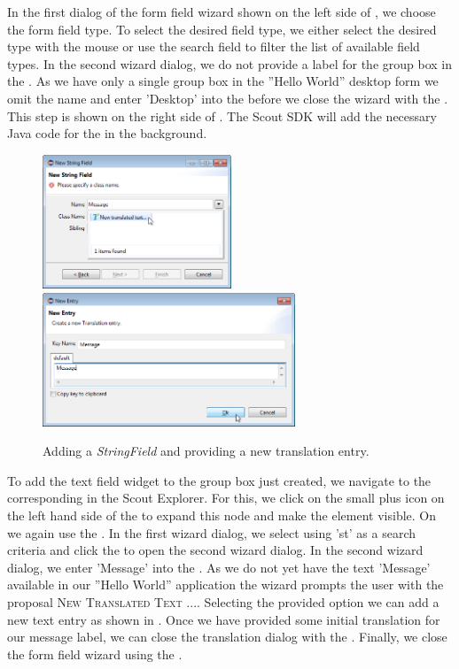 \documentclass[a4paper,10pt,twoside]{book}
\begin{document}
In the first dialog of the form field wizard shown on the left side of , we choose the form field type.
To select the desired field type, we either select the desired type with the mouse or use the search field to filter the list of available field types.
In the second wizard dialog, we do not provide a label for the group box in the .
As we have only a single group box in the ''Hello World'' desktop form we omit the name and enter 'Desktop' into the  before we close the wizard with the .
This step is shown on the right side of .
The Scout SDK will add the necessary Java code for the  in the background.

\begin{figure}
\includegraphics[height=4cm]{sdk_new_field_stringfield_1.png} \hspace{8mm}
\includegraphics[height=4cm]{sdk_new_field_stringfield_2.png}
\caption{Adding a \textit{StringField} and providing a new translation entry.}
\end{figure}

To add the text field widget to the group box just created, we navigate to the corresponding  in the Scout Explorer.
For this, we click on the small plus icon on the left hand side of the  to expand this node and make the  element visible.
On  we again use the .
In the first wizard dialog, we select  using 'st' as a search criteria and click the  to open the second wizard dialog.
In the second wizard dialog, we enter 'Message' into the .
As we do not yet have the text 'Message' available in our ''Hello World'' application the wizard prompts the user with the proposal \textsc{New Translated Text ...}.
Selecting the provided option we can add a new text entry as shown in .
Once we have provided some initial translation for our message label, we can close the translation dialog with the .
Finally, we close the form field wizard using the .
\end{document}
